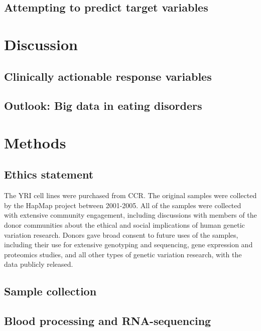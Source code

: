 \subsection{Attempting to predict target variables}\label{prediction-target-variables}


\section{Discussion}\label{ch04-discussion}

\subsection{Clinically actionable response variables}\label{study-design-and-sample-size-for-scrna-seq}

\subsection{Outlook: Big data in eating disorders}\label{the-limitations-of-the-ercc-spike-in-controls}


\section{Methods}\label{ch04-methods}

\subsection{Ethics statement}\label{ch04-ethics-statement}

The YRI cell lines were purchased from CCR. The original samples were
collected by the HapMap project between 2001-2005. All of the samples
were collected with extensive community engagement, including
discussions with members of the donor communities about the ethical
and social implications of human genetic variation research. Donors
gave broad consent to future uses of the samples, including their use
for extensive genotyping and sequencing, gene expression and
proteomics studies, and all other types of genetic variation research,
with the data publicly released.

\subsection{Sample collection}\label{cell-culture-of-ipscs}


\subsection{Blood processing and RNA-sequencing}\label{single-cell-capture-and-library-preparation}


